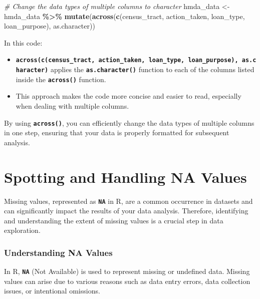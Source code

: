 \documentclass[
]{book}
\newenvironment{Shaded}{\begin{snugshade}}{\end{snugshade}}
\newcommand{\CommentTok}[1]{\textcolor[rgb]{0.56,0.35,0.01}{\textit{#1}}}
\newcommand{\FunctionTok}[1]{\textcolor[rgb]{0.13,0.29,0.53}{\textbf{#1}}}
\newcommand{\NormalTok}[1]{#1}
\newcommand{\OtherTok}[1]{\textcolor[rgb]{0.56,0.35,0.01}{#1}}
\newcommand{\SpecialCharTok}[1]{\textcolor[rgb]{0.81,0.36,0.00}{\textbf{#1}}}
\providecommand{\tightlist}{%
  \setlength{\itemsep}{0pt}\setlength{\parskip}{0pt}}
\begin{document}
\begin{Shaded}
\begin{Highlighting}[]
\CommentTok{\# Change the data types of multiple columns to character}
\NormalTok{hmda\_data }\OtherTok{\textless{}{-}}\NormalTok{ hmda\_data }\SpecialCharTok{\%\textgreater{}\%}
  \FunctionTok{mutate}\NormalTok{(}\FunctionTok{across}\NormalTok{(}\FunctionTok{c}\NormalTok{(census\_tract, action\_taken, loan\_type, loan\_purpose), as.character))}
\end{Highlighting}
\end{Shaded}

In this code:

\begin{itemize}
\tightlist
\item
  \textbf{\texttt{across(c(census\_tract,\ action\_taken,\ loan\_type,\ loan\_purpose),\ as.character)}} applies the \textbf{\texttt{as.character()}} function to each of the columns listed inside the \textbf{\texttt{across()}} function.
\item
  This approach makes the code more concise and easier to read, especially when dealing with multiple columns.
\end{itemize}

By using \textbf{\texttt{across()}}, you can efficiently change the data types of multiple columns in one step, ensuring that your data is properly formatted for subsequent analysis.

\hypertarget{spotting-and-handling-na-values}{%
\section{Spotting and Handling NA Values}\label{spotting-and-handling-na-values}}

Missing values, represented as \textbf{\texttt{NA}} in R, are a common occurrence in datasets and can significantly impact the results of your data analysis. Therefore, identifying and understanding the extent of missing values is a crucial step in data exploration.

\hypertarget{understanding-na-values}{%
\subsubsection*{Understanding NA Values}\label{understanding-na-values}}

In R, \textbf{\texttt{NA}} (Not Available) is used to represent missing or undefined data. Missing values can arise due to various reasons such as data entry errors, data collection issues, or intentional omissions.
\end{document}
